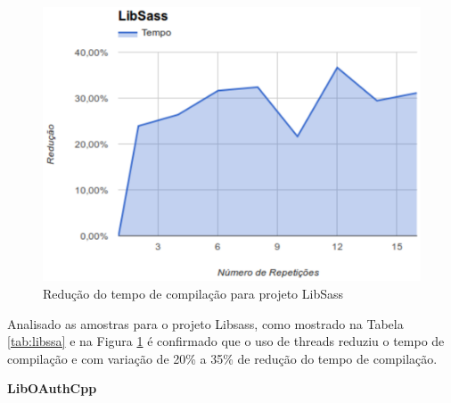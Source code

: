 \begin{figure}[h]
    \centering
        \includegraphics[keepaspectratio=true,scale=1]{figuras/libsass.eps}
    \caption{Redução do tempo de compilação para projeto LibSass}
    \label{libsass}
\end{figure}
Analisado as amostras para o projeto Libsass, como mostrado na Tabela \ref{tab:libssa} e na Figura \ref{libsass} é confirmado que o
 uso de threads reduziu o tempo de compilação e com variação
 de 20\% a 35\% de redução do tempo de compilação.

\textbf{LibOAuthCpp}

